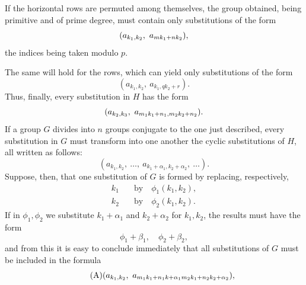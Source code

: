 If the horizontal rows are permuted among themselves, the group obtained,
being primitive and of prime degree, must contain only substitutions of the form
\[
\GalPrintedError{(a_{k_{1},k_{2}},\ a_{mk_{1}+n k_{2}})}{W10-PE003},
\]
the indices being taken modulo $p$.

The same will hold for the rows, which can yield only substitutions of the form
\[
(a_{k_{1},k_{2}},\ a_{k_{1}, qk_{2}+r}).
\]
Thus, finally, every substitution in $H$ has the form
\[
\GalPrintedError{(a_{k_{2},k_{3}},\ a_{m_{1} k_{1}+n_{1}, m_{2} k_{2}+n_{2}})}{W10-PE004}.
\]
If a group $G$ divides into $n$ groups conjugate to the one just described,
every substitution in $G$ must transform into one another the cyclic
substitutions of $H$, all written as follows:
\[
\tag{a}
(a_{k_{1},k_{2}},\ \dots,\ a_{k_{1}+\alpha_{1}, k_{2}+\alpha_{2}},\ \dots).
\]
Suppose, then, that one substitution of $G$ is formed by replacing, respectively,
\begin{align*}
k_{1} & \quad\text{by}\quad \phi_{1} (k_{1}, k_{2}),\\
k_{2} & \quad\text{by}\quad \phi_{2} (k_{1}, k_{2}).
\end{align*}
If in $\phi_{1},\phi_{2}$ we substitute $k_{1}+\alpha_{1}$ and
$k_{2}+\alpha_{2}$ for $k_{1},k_{2}$, the results must have the form
\[
\phi_{1} + \beta_{1},\quad \phi_{2} + \beta_{2},
\]
and from this it is easy to conclude immediately that all substitutions of $G$
must be included in the formula
\[
\tag{A}
\GalPrintedError{(a_{k_{1}, k_{2}},\ a_{m_{1} k_{1} + n_{1} k + \alpha_{1} m_{2} k_{1} + n_{2} k_{2} + \alpha_{2}})}{W10-PE005},
\]
